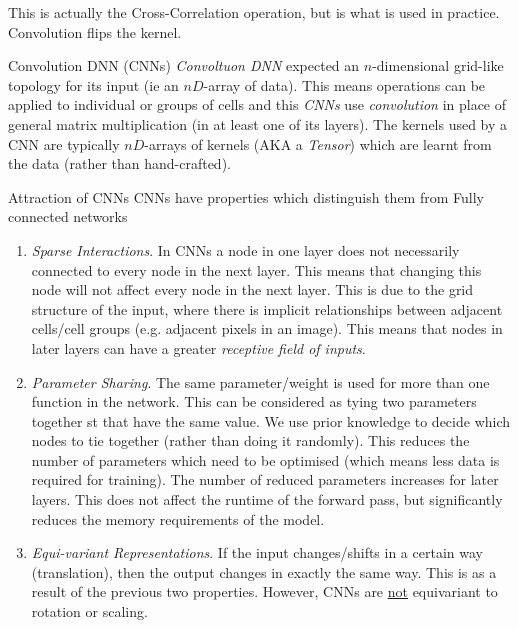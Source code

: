 \documentclass[11pt,a4paper]{article}
\begin{document}
\begin{remark}{This is actually the Cross-Correlation operation, but is what is used in practice.}
  Convolution flips the kernel.
\end{remark}

\begin{definition}{Convolution DNN (CNNs)}
  \textit{Convoltuon DNN} expected an $n$-dimensional grid-like topology for its input (ie an $nD$-array of data). This means operations can be applied to individual or groups of cells and this \textit{CNNs} use \textit{convolution} in place of general matrix multiplication (in at least one of its layers). The kernels used by a CNN are typically $nD$-arrays of kernels (AKA a \textit{Tensor}) which are learnt from the data (rather than hand-crafted).
\end{definition}

\begin{remark}{Attraction of CNNs}
  CNNs have properties which distinguish them from Fully connected networks
  \begin{enumerate}
    \item \textit{Sparse Interactions}. In CNNs a node in one layer does not necessarily connected to every node in the next layer. This means that changing this node will not affect every node in the next layer. This is due to the grid structure of the input, where there is implicit relationships between adjacent cells/cell groups (e.g. adjacent pixels in an image). This means that nodes in later layers can have a greater \textit{receptive field of inputs}.
    \item \textit{Parameter Sharing}. The same parameter/weight is used for more than one function in the network. This can be considered as tying two parameters together st that have the same value. We use prior knowledge to decide which nodes to tie together (rather than doing it randomly). This reduces the number of parameters which need to be optimised (which means less data is required for training). The number of reduced parameters increases for later layers. This does not affect the runtime of the forward pass, but significantly reduces the memory requirements of the model.
    \item \textit{Equi-variant Representations}. If the input changes/shifts in a certain way (translation), then the output changes in exactly the same way. This is as a result of the previous two properties. However, CNNs are \underline{not} equivariant to rotation or scaling.
  \end{enumerate}
\end{remark}
\end{document}
